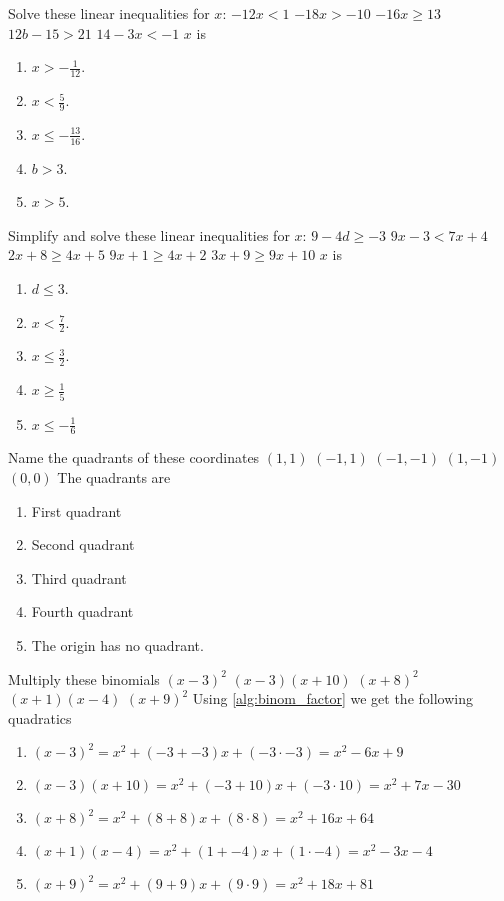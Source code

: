 \begin{ExerciseList}
\Exercise Solve these linear inequalities for $x$:
\Question $-12x < 1$
\Question $-18x > -10$
\Question $−16x \geq 13$
\Question $12b - 15 > 21$
\Question $14 - 3x < -1$
\Answer $x$ is
\begin{enumerate}
\item\myindent $x > -\frac{1}{12}$.
\item\myindent $x < \frac{5}{9}$.
\item\myindent $x \leq -\frac{13}{16}$.
\item\myindent $b>3$.
\item\myindent $x>5$.
\end{enumerate}

\Exercise Simplify and solve these linear inequalities for $x$:
\Question $9 - 4d\geq -3$
\Question $9x - 3 < 7x + 4$
\Question $2x + 8 \geq 4x + 5$
\Question $9x + 1 \geq 4x + 2$
\Question $3x + 9 \geq 9x + 10$
\Answer $x$ is
\begin{enumerate}
\item\myindent $d \leq 3$.
\item\myindent $x < \frac{7}{2}$.
\item\myindent $x \leq \frac{3}{2}$.
\item\myindent $x \geq \frac{1}{5}$
\item\myindent $x \leq -\frac{1}{6}$
\end{enumerate}

\Exercise Name the quadrants of these coordinates
\Question $(1,1)$
\Question $(-1,1)$
\Question $(-1,-1)$
\Question $(1,-1)$
\Question $(0,0)$
\Answer The quadrants are
\begin{enumerate}
\item\myindent First quadrant
\item\myindent Second quadrant
\item\myindent Third quadrant
\item\myindent Fourth quadrant
\item\myindent The origin has no quadrant.
\end{enumerate}

\Exercise Multiply these binomials
\Question $(x-3)^2$
\Question $(x-3)(x+10)$
\Question $(x+8)^2$
\Question $(x+1)(x-4)$
\Question $(x+9)^2$
\Answer Using \ref{alg:binom_factor} we get the following quadratics
\begin{enumerate}
\item\myindent $(x-3)^2 = x^2 + (-3 + -3)x + (-3 \cdot -3) = x^2 - 6x + 9$
\item\myindent $(x-3)(x+10) = x^2 + (-3 + 10)x + (-3 \cdot 10) = x^2 + 7x - 30$
\item\myindent $(x+8)^2 = x^2 + (8+8)x + (8\cdot8) = x^2 + 16x + 64$
\item\myindent $(x+1)(x-4) = x^2 + (1 + -4)x + (1 \cdot -4) = x^2 - 3x - 4$
\item\myindent $(x+9)^2 = x^2 + (9+9)x + (9\cdot9) = x^2 + 18x + 81$
\end{enumerate}


\end{ExerciseList}
